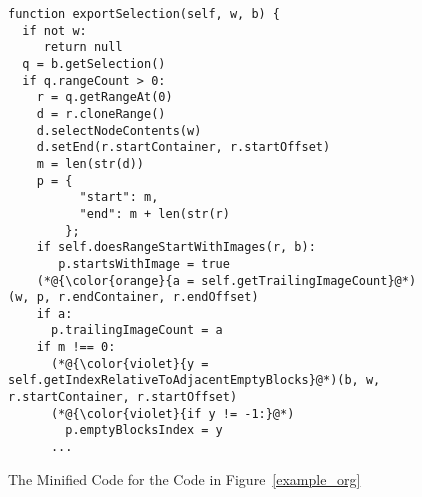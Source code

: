 \begin{figure}[t]
	\centering
	\begin{lstlisting}[]
function exportSelection(self, w, b) {
  if not w:
     return null
  q = b.getSelection()
  if q.rangeCount > 0:
    r = q.getRangeAt(0)
    d = r.cloneRange()
    d.selectNodeContents(w)
    d.setEnd(r.startContainer, r.startOffset)
    m = len(str(d))
    p = {
          "start": m,
          "end": m + len(str(r)
        };
    if self.doesRangeStartWithImages(r, b):
       p.startsWithImage = true
    (*@{\color{orange}{a = self.getTrailingImageCount}@*)(w, p, r.endContainer, r.endOffset)
    if a:
      p.trailingImageCount = a
    if m !== 0:
      (*@{\color{violet}{y = self.getIndexRelativeToAdjacentEmptyBlocks}@*)(b, w, r.startContainer, r.startOffset)
      (*@{\color{violet}{if y != -1:}@*)
        p.emptyBlocksIndex = y
      ...
\end{lstlisting}
\vspace{-12pt}
\caption{The Minified Code for the Code in Figure~\ref{example_org}}
\label{example_sim}
\end{figure}
